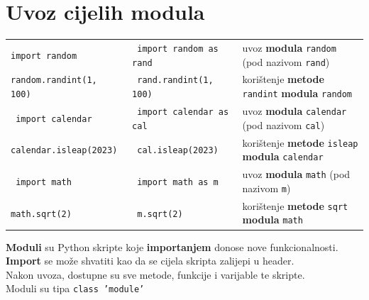 \documentclass[10pt]{article}
\begin{document}
    \section*{\color{NavyBlue} Uvoz cijelih modula}
    \begin{tabular}{|>{\tt}p{6.00cm}|>{\tt}p{6.00cm}|>{}p{12.00cm}|}
        \hline
        import random & import random as rand & uvoz \textbf{modula} \texttt{random} (pod nazivom \texttt{rand})
        \\
        random.randint(1, 100) & rand.randint(1, 100) & korištenje \textbf{metode} \texttt{randint} \textbf{modula} \texttt{random}
        \\ \hline
        import calendar & import calendar as cal & uvoz \textbf{modula} \texttt{calendar} (pod nazivom \texttt{cal})
        \\
        calendar.isleap(2023) & cal.isleap(2023) & korištenje \textbf{metode} \texttt{isleap} \textbf{modula} \texttt{calendar}
        \\ \hline
        import math & import math as m & uvoz \textbf{modula} \texttt{math} (pod nazivom \texttt{m})
        \\
        math.sqrt(2) & m.sqrt(2) & korištenje \textbf{metode} \texttt{sqrt} \textbf{modula} \texttt{math}
        \\ \hline
    \end{tabular}
    \begin{center}
        \textbf{Moduli} su Python skripte koje \textbf{importanjem} donose nove funkcionalnosti.
        \\
        \textbf{Import} se može shvatiti kao da se cijela skripta zalijepi u header.
        \\
        Nakon uvoza, dostupne su sve metode, funkcije i varijable te skripte.
        \\
        Moduli su tipa \texttt{class 'module'}
    \end{center}
\end{document}
